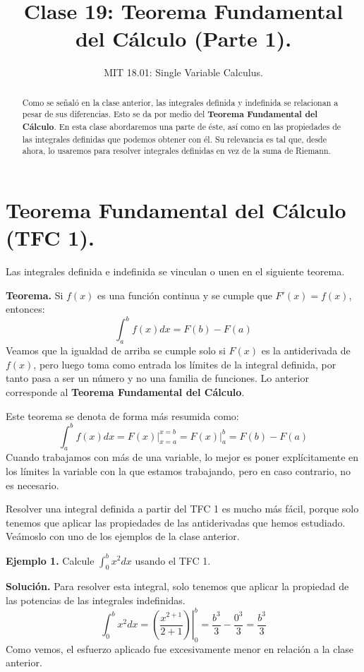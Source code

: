 \documentclass[12pt]{article}
\title{Clase 19: Teorema Fundamental del Cálculo (Parte 1).}
\author{MIT 18.01: Single Variable Calculus.}
\date{}
\begin{document}
\maketitle

\begin{abstract}
\noindent Como se señaló en la clase anterior, las integrales definida y indefinida se relacionan a pesar de sus diferencias. Esto se da por medio del \textbf{Teorema Fundamental del Cálculo}. En esta clase abordaremos una parte de éste, así como en las propiedades de las integrales definidas que podemos obtener con él. Su relevancia es tal que, desde ahora, lo usaremos para resolver integrales definidas en vez de la suma de Riemann.
\end{abstract}


\section{Teorema Fundamental del Cálculo (TFC 1).}

Las integrales definida e indefinida se vinculan o unen en el siguiente teorema.

\textbf{Teorema.} Si $f(x)$ es una función continua y se cumple que $F'(x) = f(x)$, entonces:
\[
  \int_{a}^{b} f(x)dx = F(b) - F(a)
\]
Veamos que la igualdad de arriba se cumple solo si $F(x)$ es la antiderivada de $f(x)$, pero luego toma como entrada los límites de la integral definida, por tanto pasa a ser un número y no una familia de funciones. Lo anterior corresponde al \textbf{Teorema Fundamental del Cálculo}.

Este teorema se denota de forma más resumida como:
\[
  \int_{a}^{b} f(x) dx = \left.F(x)\right|_{x = a}^{x = b} = \left.F(x)\right|_{a}^{b} = F(b) - F(a)
\]
Cuando trabajamos con más de una variable, lo mejor es poner explícitamente en los límites la variable con la que estamos trabajando, pero en caso contrario, no es necesario.

Resolver una integral definida a partir del TFC 1 es mucho más fácil, porque solo tenemos que aplicar las propiedades de las antiderivadas que hemos estudiado. Veámoslo con uno de los ejemplos de la clase anterior.

\textbf{Ejemplo 1.} \quad Calcule $\int_{0}^{b} x^{2} dx$ usando el TFC 1.

\textbf{Solución.} \quad Para resolver esta integral, solo tenemos que aplicar la propiedad de las potencias de las integrales indefinidas.
\[
  \int_{0}^{b} x^{2} dx = \left.\left(\frac{x^{2 + 1}}{2 + 1}\right)\right|_{0}^{b}
                        = \frac{b^{3}}{3} - \frac{0^{3}}{3}
                        = \frac{b^{3}}{3}
\]
Como vemos, el esfuerzo aplicado fue excesivamente menor en relación a la clase anterior.
\end{document}
